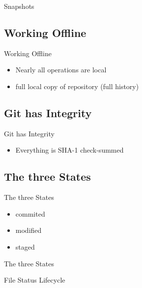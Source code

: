 \documentclass{beamer}
\begin{document}
\begin{frame}{Snapshots}
    \centering
    \hfill\vfill
\end{frame}

\subsection{Working Offline}

\begin{frame}{Working Offline}
  \begin{itemize}
  \item
    Nearly all operations are local
  \item
    full local copy of repository (full history)
  \end{itemize}
\end{frame}

\subsection{Git has Integrity}

\begin{frame}{Git has Integrity}
  \begin{itemize}
  \item
    Everything is SHA-1 check-summed
  \end{itemize}
\end{frame}

\subsection{The three States}

\begin{frame}{The three States}
  \begin{itemize}
  \item
    commited
  \item
    modified
  \item
    staged
  \end{itemize}
\end{frame}

\begin{frame}{The three States}
    \centering
    \hfill\vfill
\end{frame}

\begin{frame}{File Status Lifecycle}
    \centering
    \hfill\vfill
\end{frame}
\end{document}
